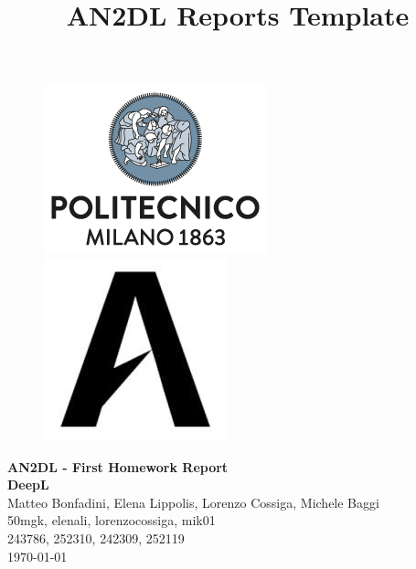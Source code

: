 \documentclass[11pt]{article}
\title{AN2DL Reports Template}
\begin{document}
    
    \begin{figure}[H]
        \raggedright
        \includegraphics[scale=0.4]{figures/polimi.png} \hfill \includegraphics[scale=0.3]{figures/airlab.jpeg}
    \end{figure}
    
    \vspace{5mm}
    
    \begin{center}
        {\Large \textbf{AN2DL - First Homework Report}}\\
        \vspace{2mm}
        {\Large \textbf{DeepL}}\\
        \vspace{2mm}
        {\large Matteo Bonfadini,}
        {\large Elena Lippolis,}
        {\large Lorenzo Cossiga,}
        {\large Michele Baggi}\\
        \vspace{2mm}
        {50mgk,}
        {elenali,}
        {lorenzocossiga,}
        {mik01}\\
        \vspace{2mm}
        {243786,}
        {252310,}
        {242309,}
        {252119}\\
        \vspace{5mm}
        \today
    \end{center}    
    \vspace{5mm}
    
\end{document}

